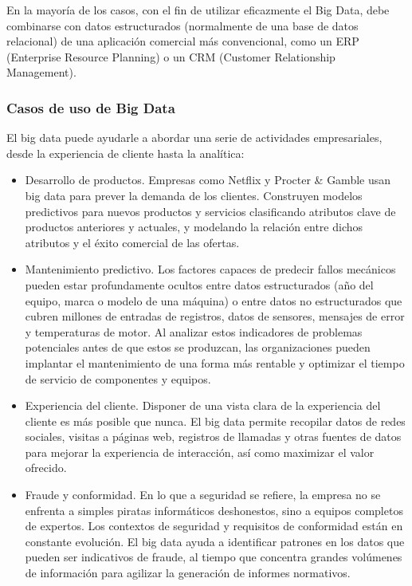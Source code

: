 \documentclass[runningheads,a4paper,12pt]{report}
\begin{document}
En la mayoría de los casos, con el fin de utilizar eficazmente el Big Data, debe combinarse con datos estructurados (normalmente de una base de datos relacional) de una aplicación comercial más convencional, como un ERP (Enterprise Resource Planning) o un CRM (Customer Relationship Management).\\

\subsubsection{Casos de uso de Big Data \cite{bigdata}}
El big data puede ayudarle a abordar una serie de actividades empresariales, desde la experiencia de cliente hasta la analítica: \\

\begin{itemize}
	\item Desarrollo de productos. Empresas como Netflix y Procter \& Gamble usan big data para prever la demanda de los clientes. Construyen modelos predictivos para nuevos productos y servicios clasificando atributos clave de productos anteriores y actuales, y modelando la relación entre dichos atributos y el éxito comercial de las ofertas. \\
	\item Mantenimiento predictivo. Los factores capaces de predecir fallos mecánicos pueden estar profundamente ocultos entre datos estructurados (año del equipo, marca o modelo de una máquina) o entre datos no estructurados que cubren millones de entradas de registros, datos de sensores, mensajes de error y temperaturas de motor. Al analizar estos indicadores de problemas potenciales antes de que estos se produzcan, las organizaciones pueden implantar el mantenimiento de una forma más rentable y optimizar el tiempo de servicio de componentes y equipos.\\
	\item Experiencia del cliente. Disponer de una vista clara de la experiencia del cliente es más posible que nunca. El big data permite recopilar datos de redes sociales, visitas a páginas web, registros de llamadas y otras fuentes de datos para mejorar la experiencia de interacción, así como maximizar el valor ofrecido. \\
	\item Fraude y conformidad. En lo que a seguridad se refiere, la empresa no se enfrenta a simples piratas informáticos deshonestos, sino a equipos completos de expertos. Los contextos de seguridad y requisitos de conformidad están en constante evolución. El big data ayuda a identificar patrones en los datos que pueden ser indicativos de fraude, al tiempo que concentra grandes volúmenes de información para agilizar la generación de informes normativos. \\

\end{itemize}
\end{document}
